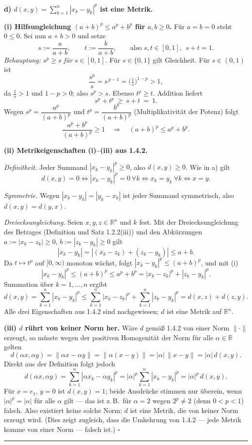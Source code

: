 \documentclass[a4paper,11pt]{article}
\begin{document}
\medskip
\textbf{d) $d(x,y)=\sum_{k=1}^n|x_k-y_k|^p$ ist eine Metrik.}

\textbf{(i) Hilfsungleichung $(a+b)^p\le a^p+b^p$ für $a,b\ge 0$.}
Für $a=b=0$ steht $0\le 0$. Sei nun $a+b>0$ und setze
\[
s:=\frac{a}{a+b},\qquad t:=\frac{b}{a+b},\qquad\text{also } s,t\in[0,1],\ \ s+t=1 .
\]
\emph{Behauptung: $s^p\ge s$ für $s\in[0,1]$.} Für $s\in\{0,1\}$ gilt Gleichheit. Für $s\in(0,1)$ ist
\[
\frac{s^p}{s}=s^{\,p-1}=\Big(\tfrac1s\Big)^{1-p}>1,
\]
da $\tfrac1s>1$ und $1-p>0$; also $s^p>s$. Ebenso $t^p\ge t$. Addition liefert
\[
s^p+t^p\ \ge\ s+t\ =\ 1 .
\]
Wegen $s^p=\dfrac{a^p}{(a+b)^p}$ und $t^p=\dfrac{b^p}{(a+b)^p}$ (Multiplikativität der Potenz) folgt
\[
\frac{a^p+b^p}{(a+b)^p}\ge 1\quad\Longrightarrow\quad (a+b)^p\le a^p+b^p .
\]

\textbf{(ii) Metrikeigenschaften (i)–(iii) aus 1.4.2.}

\emph{Definitheit.} Jeder Summand $|x_k-y_k|^p\ge 0$, also $d(x,y)\ge 0$. Wie in a) gilt
\[
d(x,y)=0\iff |x_k-y_k|^p=0\ \forall k\iff x_k=y_k\ \forall k\iff x=y .
\]

\emph{Symmetrie.} Wegen $|x_k-y_k|=|y_k-x_k|$ ist jeder Summand symmetrisch, also $d(x,y)=d(y,x)$.

\emph{Dreiecksungleichung.} Seien $x,y,z\in\mathbb{R}^n$ und $k$ fest. Mit der Dreiecksungleichung des Betrages (Definition und Satz 1.2.2(iii)) und den Abkürzungen $a:=|x_k-z_k|\ge 0$, $b:=|z_k-y_k|\ge 0$ gilt
\[
|x_k-y_k|=|(x_k-z_k)+(z_k-y_k)|\le a+b .
\]
Da $t\mapsto t^p$ auf $[0,\infty)$ monoton wächst, folgt $|x_k-y_k|^p\le (a+b)^p$, und mit (i)
\[
|x_k-y_k|^p\le (a+b)^p\le a^p+b^p=|x_k-z_k|^p+|z_k-y_k|^p .
\]
Summation über $k=1,\dots,n$ ergibt
\[
d(x,y)=\sum_{k=1}^n|x_k-y_k|^p
\le \sum_{k=1}^n|x_k-z_k|^p+\sum_{k=1}^n|z_k-y_k|^p
= d(x,z)+d(z,y) .
\]
Alle drei Eigenschaften aus 1.4.2 sind nachgewiesen; $d$ ist eine Metrik auf $\mathbb{R}^n$.

\textbf{(iii) $d$ rührt von keiner Norm her.}
Wäre $d$ gemäß 1.4.2 von einer Norm $\|\cdot\|$ erzeugt, so müsste wegen der positiven Homogenität der Norm für alle $\alpha\in\mathbb{R}$ gelten
\[
d(\alpha x,\alpha y)=\|\alpha x-\alpha y\|=\|\alpha(x-y)\|=|\alpha|\,\|x-y\|=|\alpha|\,d(x,y).
\]
Direkt aus der Definition folgt jedoch
\[
d(\alpha x,\alpha y)=\sum_{k=1}^n|\alpha x_k-\alpha y_k|^p=|\alpha|^p\sum_{k=1}^n|x_k-y_k|^p=|\alpha|^p\,d(x,y).
\]
Für $x=e_1$, $y=0$ ist $d(x,y)=1$; beide Ausdrücke stimmen nur überein, wenn $|\alpha|^p=|\alpha|$ für alle $\alpha$ gilt — das ist z.\,B.\ für $\alpha=2$ wegen $2^p\ne 2$ (denn $0<p<1$) falsch. Also existiert keine solche Norm: $d$ ist eine Metrik, die von keiner Norm erzeugt wird. (Dies zeigt zugleich, dass die Umkehrung von 1.4.2 — jede Metrik komme von einer Norm — falsch ist.) \hfill$\square$\par\bigskip\hrule\bigskip
\end{document}
